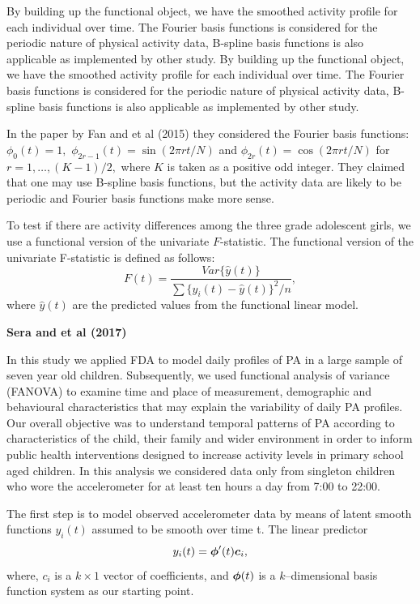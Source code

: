 \documentclass[12pt]{article}
\newcommand{\bphi}{\mbox{\boldmath$\phi$}}
\newcommand{\bc}{\mbox{\boldmath$c$}}
\begin{document}
    By building up the functional object, we have the smoothed activity profile for each individual over time.
     The Fourier basis functions is considered for the periodic nature of physical activity data, B-spline basis
     functions is also applicable as implemented by other study. By building up the functional object, we have
      the smoothed activity profile for each individual over time. The Fourier basis functions is considered
      for the periodic nature of physical activity data, B-spline basis functions is also applicable as implemented by other study.

    In the paper by Fan and et al (2015) they considered the Fourier basis functions: $ \phi_0(t) = 1,$ $\phi_{2r-1}(t)=\sin(2\pi rt/N)$
     and $\phi_{2r}(t)=\cos(2\pi rt/N)$ for $r=1,\ldots,(K-1)/2,$ where $K$ is taken as a positive odd integer.
     They claimed that one may use B-spline basis functions, but the activity data are likely to be periodic and
     Fourier basis functions make more sense.

    To test if there are activity differences among the three grade adolescent girls, we use a functional version
    of the univariate $F$-statistic. The functional version of the univariate F-statistic is defined as follows:
    \[ F(t) = \frac{Var\{\hat{y}(t)\}}{\sum\{y_i(t) - \hat{y}(t)\}^2/n },\]
    where $\hat{y}(t)$ are the predicted values from the functional linear model.



    \textbf{Sera and et al (2017)}

    In this study we applied FDA to model daily profiles of PA in a large sample of seven year old children.
    Subsequently, we used functional analysis of variance (FANOVA) to examine time and place of measurement,
    demographic and behavioural characteristics that may explain the variability of daily PA profiles.
    Our overall objective was to understand temporal patterns of PA according to characteristics of
    the child, their family and wider environment in order to inform public health interventions designed
    to increase activity levels in primary school aged children. In this analysis we considered data
    only from singleton children who wore the accelerometer for at least ten hours a day from 7:00 to 22:00.

    The first step is to model observed accelerometer data by means of latent smooth functions
    $y_i(t)$ assumed to be smooth over time t. The linear predictor
      \[ y_i(t) = \bphi'(t) \bc_i,\]
    where, $c_i$ is a $k \times 1$ vector of coefficients, and $\bphi(t)$ is a $k$–dimensional basis
    function system as our starting point.
\end{document}

